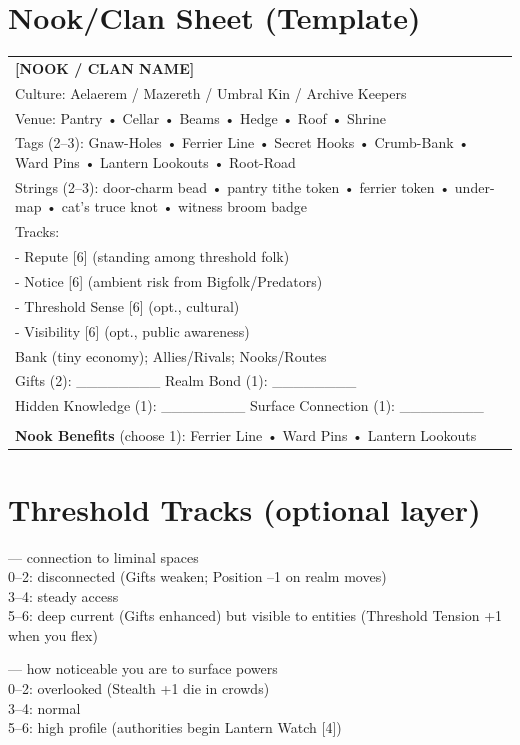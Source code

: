 \documentclass[11pt]{book}
\begin{document}
\section{Nook/Clan Sheet (Template)}
\begin{center}
\begin{tabularx}{\textwidth}{|X|}
\hline
\textbf{[NOOK / CLAN NAME]} \\
Culture: Aelaerem / Mazereth / Umbral Kin / Archive Keepers \\
Venue: Pantry • Cellar • Beams • Hedge • Roof • Shrine \\
Tags (2--3): Gnaw-Holes • Ferrier Line • Secret Hooks • Crumb-Bank • Ward Pins • Lantern Lookouts • Root-Road \\
Strings (2--3): door-charm bead • pantry tithe token • ferrier token • under-map • cat's truce knot • witness broom badge \\
Tracks: \\
- Repute [6] (standing among threshold folk) \\
- Notice [6] (ambient risk from Bigfolk/Predators) \\
- Threshold Sense [6] (opt., cultural) \\
- Visibility [6] (opt., public awareness) \\
Bank (tiny economy); Allies/Rivals; Nooks/Routes \\
Gifts (2): \_\_\_\_\_\_\_\_  Realm Bond (1): \_\_\_\_\_\_\_\_ \\
Hidden Knowledge (1): \_\_\_\_\_\_\_\_  Surface Connection (1): \_\_\_\_\_\_\_\_ \\
\\
\textbf{Nook Benefits} (choose 1): Ferrier Line • Ward Pins • Lantern Lookouts \\
\hline
\end{tabularx}
\end{center}

\section{Threshold Tracks (optional layer)}
 --- connection to liminal spaces \\
0--2: disconnected (Gifts weaken; Position --1 on realm moves) \\
3--4: steady access \\
5--6: deep current (Gifts enhanced) but visible to entities (Threshold Tension +1 when you flex)

 --- how noticeable you are to surface powers \\
0--2: overlooked (Stealth +1 die in crowds) \\
3--4: normal \\
5--6: high profile (authorities begin Lantern Watch [4])
\end{document}
